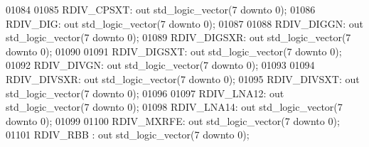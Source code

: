 \begin{DoxyCode}
01084 
01085         RDIV\_CPSXT: \textcolor{keywordflow}{out} \textcolor{comment}{std\_logic\_vector}(\textcolor{vhdllogic}{}\textcolor{vhdllogic}{7} \textcolor{keywordflow}{downto} \textcolor{vhdllogic}{}\textcolor{vhdllogic}{0});
01086         RDIV\_DIG:   \textcolor{keywordflow}{out} \textcolor{comment}{std\_logic\_vector}(\textcolor{vhdllogic}{}\textcolor{vhdllogic}{7} \textcolor{keywordflow}{downto} \textcolor{vhdllogic}{}\textcolor{vhdllogic}{0});
01087 
01088         RDIV\_DIGGN: \textcolor{keywordflow}{out} \textcolor{comment}{std\_logic\_vector}(\textcolor{vhdllogic}{}\textcolor{vhdllogic}{7} \textcolor{keywordflow}{downto} \textcolor{vhdllogic}{}\textcolor{vhdllogic}{0});
01089         RDIV\_DIGSXR:    \textcolor{keywordflow}{out} \textcolor{comment}{std\_logic\_vector}(\textcolor{vhdllogic}{}\textcolor{vhdllogic}{7} \textcolor{keywordflow}{downto} \textcolor{vhdllogic}{}\textcolor{vhdllogic}{0});
01090 
01091         RDIV\_DIGSXT:    \textcolor{keywordflow}{out} \textcolor{comment}{std\_logic\_vector}(\textcolor{vhdllogic}{}\textcolor{vhdllogic}{7} \textcolor{keywordflow}{downto} \textcolor{vhdllogic}{}\textcolor{vhdllogic}{0});
01092         RDIV\_DIVGN: \textcolor{keywordflow}{out} \textcolor{comment}{std\_logic\_vector}(\textcolor{vhdllogic}{}\textcolor{vhdllogic}{7} \textcolor{keywordflow}{downto} \textcolor{vhdllogic}{}\textcolor{vhdllogic}{0});
01093 
01094         RDIV\_DIVSXR:    \textcolor{keywordflow}{out} \textcolor{comment}{std\_logic\_vector}(\textcolor{vhdllogic}{}\textcolor{vhdllogic}{7} \textcolor{keywordflow}{downto} \textcolor{vhdllogic}{}\textcolor{vhdllogic}{0});
01095         RDIV\_DIVSXT:    \textcolor{keywordflow}{out} \textcolor{comment}{std\_logic\_vector}(\textcolor{vhdllogic}{}\textcolor{vhdllogic}{7} \textcolor{keywordflow}{downto} \textcolor{vhdllogic}{}\textcolor{vhdllogic}{0});
01096 
01097         RDIV\_LNA12: \textcolor{keywordflow}{out} \textcolor{comment}{std\_logic\_vector}(\textcolor{vhdllogic}{}\textcolor{vhdllogic}{7} \textcolor{keywordflow}{downto} \textcolor{vhdllogic}{}\textcolor{vhdllogic}{0});
01098         RDIV\_LNA14: \textcolor{keywordflow}{out} \textcolor{comment}{std\_logic\_vector}(\textcolor{vhdllogic}{}\textcolor{vhdllogic}{7} \textcolor{keywordflow}{downto} \textcolor{vhdllogic}{}\textcolor{vhdllogic}{0});
01099 
01100         RDIV\_MXRFE: \textcolor{keywordflow}{out} \textcolor{comment}{std\_logic\_vector}(\textcolor{vhdllogic}{}\textcolor{vhdllogic}{7} \textcolor{keywordflow}{downto} \textcolor{vhdllogic}{}\textcolor{vhdllogic}{0});
01101         RDIV\_RBB :  \textcolor{keywordflow}{out} \textcolor{comment}{std\_logic\_vector}(\textcolor{vhdllogic}{}\textcolor{vhdllogic}{7} \textcolor{keywordflow}{downto} \textcolor{vhdllogic}{}\textcolor{vhdllogic}{0});

\end{DoxyCode}
